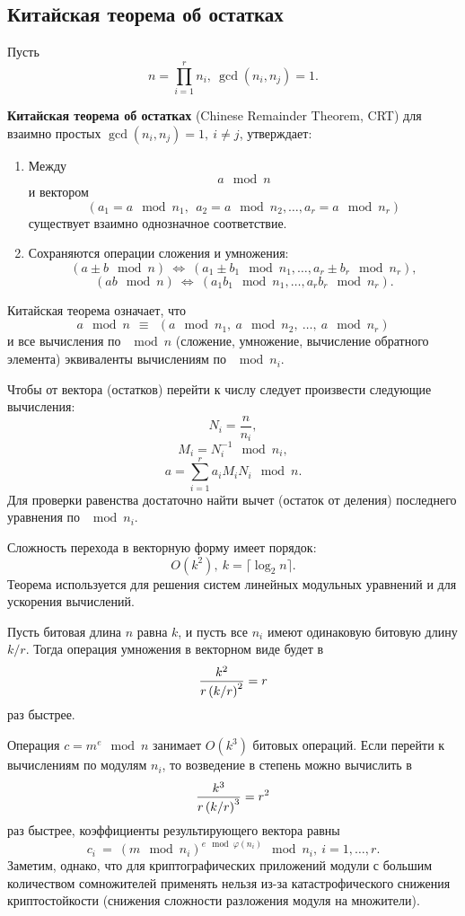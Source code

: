 \subsection{Китайская теорема об остатках}

Пусть
    \[ n = \prod\limits_{i=1}^{r} n_i, ~ \gcd(n_i, n_j) = 1. \]

 \textbf{Китайская теорема об остатках} (Chinese Remainder Theorem, CRT) для взаимно простых $\gcd(n_i,n_j) = 1, ~ i \neq j$, утверждает:
\begin{enumerate}
    \item Между
        \[ a \mod n \]
        и вектором
        \[ (a_1 = a \mod n_1, ~~ a_2 = a \mod n_2,  \dots,  a_r = a \mod n_r) \]
        существует взаимно однозначное соответствие.
    \item Сохраняются операции сложения и умножения:
        \[ (a \pm b \mod n) ~\Leftrightarrow~ (a_1 \pm b_1 \mod n_1,  \dots,  a_r \pm b_r \mod n_r), \]
        \[ (a b \mod n) ~\Leftrightarrow~ (a_1 b_1 \mod n_1,  \dots,  a_r b_r \mod n_r). \]
\end{enumerate}

Китайская теорема означает, что
    \[ a \mod n ~~\equiv~~ (a \mod n_1, ~ a \mod n_2, ~ \dots, ~ a \mod n_r) \]
и все вычисления по $\mod n$ (сложение, умножение, вычисление обратного элемента) эквиваленты вычислениям по $\mod n_i$.

Чтобы от вектора (остатков) перейти к числу следует произвести следующие вычисления:
        \[ N_i = \frac{n}{n_i}, \]
        \[ M_i = N_i^{-1} \mod n_i, \]
        \[ a = \sum\limits_{i=1}^{r} a_i M_i N_i \mod n. \]
        Для проверки равенства достаточно найти вычет (остаток от деления) последнего уравнения по $\mod n_i$.

        Сложность перехода в векторную форму имеет порядок:
        \[ O(k^2), ~ k = \lceil \log_2 n \rceil. \]
Теорема используется для решения систем линейных модульных уравнений и для ускорения вычислений.

Пусть битовая длина $n$ равна $k$, и пусть все $n_i$ имеют одинаковую битовую длину $k / r$. Тогда операция умножения в векторном виде будет в
    \[ \frac{k^2}{r \left( k \middle/ r \right)^2 } = r \]
раз быстрее.

Операция $c = m^e \mod n$ занимает $O(k^3)$ битовых операций. Если перейти к вычислениям по модулям $n_i$, то возведение в степень можно вычислить в
    \[ \frac{k^3}{r \left( k \middle/ r \right)^3 } = r^2 \]
раз быстрее, коэффициенты результирующего вектора равны
    \[ c_i ~=~ \left( m \mod n_i \right)^{e \mod \varphi(n_i)} \mod n_i, ~ i = 1, \dots, r. \]
Заметим, однако, что для криптографических приложений модули с большим количеством сомножителей применять нельзя из-за катастрофического снижения криптостойкости (снижения сложности разложения модуля на множители).



